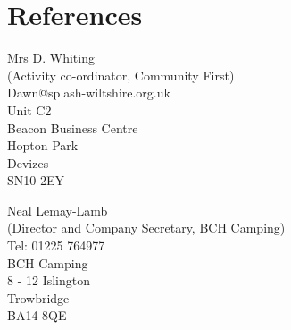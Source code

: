 \section*{References}
\begin{minipage}{0.5\linewidth}
Mrs D. Whiting\\
(Activity co-ordinator, Community First)\\
Dawn@splash-wiltshire.org.uk\\
Unit C2\\
Beacon Business Centre\\
Hopton Park\\
Devizes\\
SN10 2EY\\
\end{minipage}
\begin{minipage}{0.5\linewidth}
Neal Lemay-Lamb\\
(Director and Company Secretary, BCH Camping)\\
Tel: 01225 764977\\
BCH Camping\\
8 - 12 Islington\\
Trowbridge\\
BA14 8QE
\end{minipage}